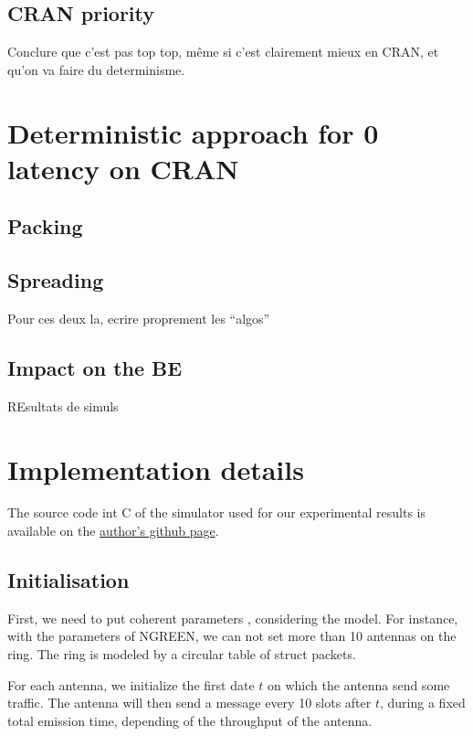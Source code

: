 \documentclass[a4paper,10pt]{article}
\begin{document}
  \subsection{CRAN priority}
  Conclure que c'est pas top top, même si c'est clairement mieux en CRAN, et qu'on va faire du determinisme.

\section{Deterministic approach for 0 latency on CRAN}
\label{det}
  \subsection{Packing}
  \subsection{Spreading}
  Pour ces deux la, ecrire proprement les ``algos''
  \subsection{Impact on the BE}
  REsultats de simuls
  
  
\section{ Implementation details}

	The source code int C of the simulator used for our experimental results is available on the \href{https://github.com/Mael-Guiraud/Ngreen.git}{ author's github page}.
	\subsection{Initialisation}
	First, we need to put coherent parameters , considering the model. For instance, with the parameters of NGREEN, we can not set more than 10 antennas on the ring. 
	The ring is modeled by a circular table of struct packets. 
	
	\begin{algorithm}[H]
	\end{algorithm}
	
	For each antenna, we initialize the first date $t$ on which the antenna send some traffic. The antenna will then send a message every 10 slots after $t$, during a fixed total emission time, depending of the throughput of the antenna.
	
\end{document}
